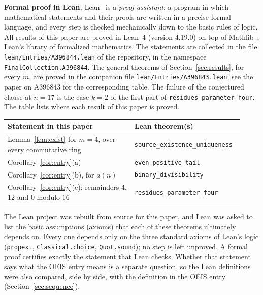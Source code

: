 \documentclass[11pt,a4paper]{article}
\theoremstyle{definition}
\theoremstyle{remark}
\newcommand{\para}[1]{\par\medskip\noindent\textbf{#1}\enspace}
\begin{document}
\para{Formal proof in Lean.}
Lean~\cite{lean} is a \emph{proof assistant}: a program in which mathematical statements and their proofs are written
in a precise formal language, and every step is checked mechanically down to the basic rules of logic. All results of
this paper are proved in Lean~4 (version 4.19.0) on top of Mathlib~\cite{mathlib}, Lean's library of formalized
mathematics. The statements are collected in the file \texttt{lean/Entries/A396844.lean} of the repository,
in the namespace \texttt{FinalCollection.A396844}. The general theorems of Section~\ref{sec:results}, for every $m$, are proved in the companion file
\texttt{lean/Entries/A396843.lean}; see the paper on A396843 for the corresponding table. The failure of the
conjectured clause at $n=17$ is the case $k=2$ of the first part of \texttt{residues\_parameter\_four}.
The table lists where each result of this paper is proved.
\begin{center}\small\renewcommand{\arraystretch}{1.25}
\begin{tabular}{>{\raggedright\arraybackslash}p{0.52\linewidth}>{\raggedright\arraybackslash}p{0.4\linewidth}}
\toprule
Statement in this paper & Lean theorem(s)\\
\midrule
Lemma~\ref{lem:exist} for $m=4$, over every commutative ring & \texttt{source\_\allowbreak{}existence\_\allowbreak{}uniqueness} \\
Corollary~\ref{cor:entry}(a) & \texttt{even\_\allowbreak{}positive\_\allowbreak{}tail} \\
Corollary~\ref{cor:entry}(b), for $a(n)$ & \texttt{binary\_\allowbreak{}divisibility} \\
Corollary~\ref{cor:entry}(c): remainders $4$, $12$ and $0$ modulo $16$ & \texttt{residues\_\allowbreak{}parameter\_\allowbreak{}four} \\
\bottomrule
\end{tabular}
\end{center}
The Lean project was rebuilt from source for this paper, and Lean was asked to list the basic assumptions (axioms)
that each of these theorems ultimately depends on. Every one depends only on the three standard axioms of Lean's logic
(\texttt{propext}, \texttt{Classical.choice}, \texttt{Quot.sound}); no step is left unproved. A formal proof certifies
exactly the statement that Lean checks. Whether that statement says what the OEIS entry means is a separate question,
so the Lean definitions were also compared, side by side, with the definition in the OEIS entry
(Section~\ref{sec:sequence}).
\end{document}
